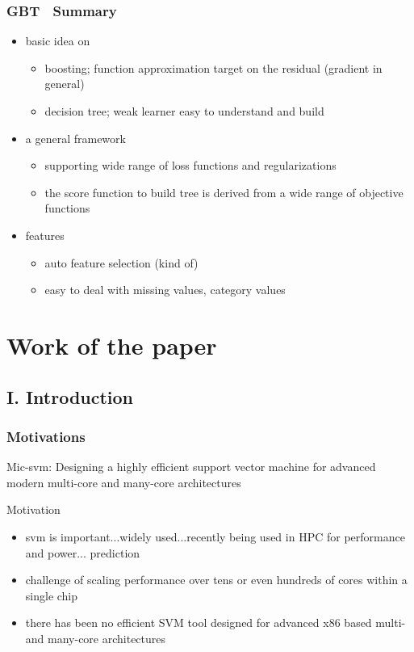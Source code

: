 \documentclass{beamer}
\begin{document}
\begin{frame}
	\frametitle{GBT　Summary}
	\begin{itemize}
		\item basic idea on
		\begin{itemize}
			\item boosting; function approximation target on the residual (gradient in general)
			\item decision tree; weak learner easy to understand and build
		\end{itemize}
		\item a general framework
		\begin{itemize}
			\item supporting wide range of loss functions and regularizations
			\item the score function to build tree is derived from a wide range of objective functions
		\end{itemize}
		\item features
		\begin{itemize}
			\item auto feature selection (kind of)
			\item easy to deal with missing values, category values
		\end{itemize}		

		
	\end{itemize}
	
\end{frame}

\section{Work of the paper} %
\subsection{I. Introduction} 
\begin{frame}
	\frametitle{Motivations}
	Mic-svm: Designing a highly efficient support vector machine for advanced modern multi-core and many-core architectures
	\begin{block}{Motivation}
		\begin{itemize}
			\item svm is important...widely used...recently being used in HPC for performance and power...
			prediction
			\item challenge
			of scaling performance over tens or even hundreds of cores within a
			single chip
			\item there has been
			no efficient SVM tool designed for advanced x86 based multi- and
			many-core architectures
		\end{itemize}		
	\end{block}
	
\end{frame}
\end{document}
